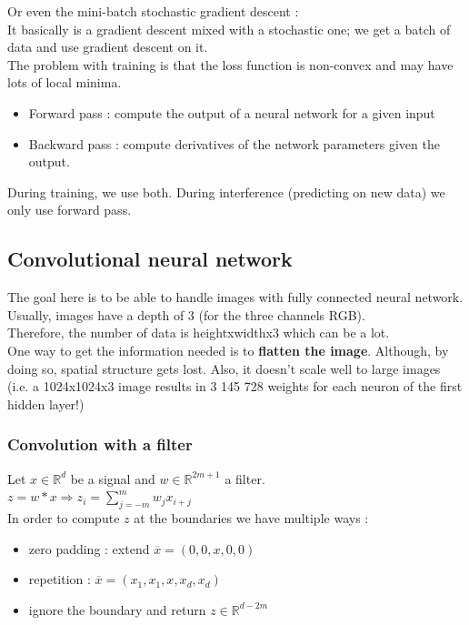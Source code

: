 \documentclass[../main.tex]{subfiles}
\begin{document}
Or even the mini-batch stochastic gradient descent :\\
It basically is a gradient descent mixed with a stochastic one; we get a batch of data and use gradient descent on it.\\

The problem with training is that the loss function is non-convex and may have lots of local minima.\\

\begin{itemize}
    \item Forward pass : compute the output of a neural network for a given input\\
    \item Backward pass : compute derivatives of the network parameters given the output.\\
\end{itemize}

During training, we use both. During interference (predicting on new data) we only use forward pass.\\

\subsection{Convolutional neural network}
The goal here is to be able to handle images with fully connected neural network. Usually, images have a depth of 3 (for the three channels RGB).\\
Therefore, the number of data is heightxwidthx3 which can be a lot.\\

One way to get the information needed is to \textbf{flatten the image}. Although, by doing so, spatial structure gets lost. Also, it doesn't scale well to large images (i.e. a 1024x1024x3 image results in 3 145 728 weights for each neuron of the first hidden layer!)\\


\subsubsection{Convolution with a filter}
Let $x\in \mathbb{R}^d$ be a signal and $w\in\mathbb{R}^{2m+1}$ a filter.\\$z = w*x \Rightarrow z_i = \sum_{j=-m}^{m} w_j x_{i+j}$\\

In order to compute $z$ at the boundaries we have multiple ways : \begin{itemize}
    \item zero padding : extend $\overline{x} = (0,0,x,0,0)$\\
    \item repetition : $\overline{x} = (x_1, x_1, x, x_d, x_d)$\\
    \item ignore the boundary and return $z\in \mathbb{R}^{d-2m}$\\
\end{itemize}
\end{document}
